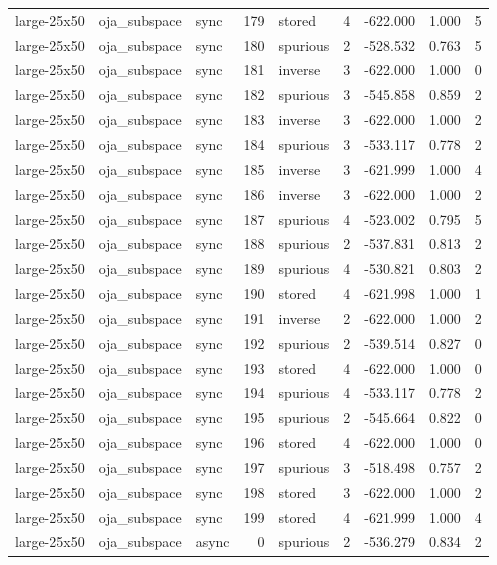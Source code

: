 \begin{tabular}{lllrlrrrr}
large-25x50 & oja\_subspace & sync & 179 & stored & 4 & -622.000 & 1.000 & 5 \\
large-25x50 & oja\_subspace & sync & 180 & spurious & 2 & -528.532 & 0.763 & 5 \\
large-25x50 & oja\_subspace & sync & 181 & inverse & 3 & -622.000 & 1.000 & 0 \\
large-25x50 & oja\_subspace & sync & 182 & spurious & 3 & -545.858 & 0.859 & 2 \\
large-25x50 & oja\_subspace & sync & 183 & inverse & 3 & -622.000 & 1.000 & 2 \\
large-25x50 & oja\_subspace & sync & 184 & spurious & 3 & -533.117 & 0.778 & 2 \\
large-25x50 & oja\_subspace & sync & 185 & inverse & 3 & -621.999 & 1.000 & 4 \\
large-25x50 & oja\_subspace & sync & 186 & inverse & 3 & -622.000 & 1.000 & 2 \\
large-25x50 & oja\_subspace & sync & 187 & spurious & 4 & -523.002 & 0.795 & 5 \\
large-25x50 & oja\_subspace & sync & 188 & spurious & 2 & -537.831 & 0.813 & 2 \\
large-25x50 & oja\_subspace & sync & 189 & spurious & 4 & -530.821 & 0.803 & 2 \\
large-25x50 & oja\_subspace & sync & 190 & stored & 4 & -621.998 & 1.000 & 1 \\
large-25x50 & oja\_subspace & sync & 191 & inverse & 2 & -622.000 & 1.000 & 2 \\
large-25x50 & oja\_subspace & sync & 192 & spurious & 2 & -539.514 & 0.827 & 0 \\
large-25x50 & oja\_subspace & sync & 193 & stored & 4 & -622.000 & 1.000 & 0 \\
large-25x50 & oja\_subspace & sync & 194 & spurious & 4 & -533.117 & 0.778 & 2 \\
large-25x50 & oja\_subspace & sync & 195 & spurious & 2 & -545.664 & 0.822 & 0 \\
large-25x50 & oja\_subspace & sync & 196 & stored & 4 & -622.000 & 1.000 & 0 \\
large-25x50 & oja\_subspace & sync & 197 & spurious & 3 & -518.498 & 0.757 & 2 \\
large-25x50 & oja\_subspace & sync & 198 & stored & 3 & -622.000 & 1.000 & 2 \\
large-25x50 & oja\_subspace & sync & 199 & stored & 4 & -621.999 & 1.000 & 4 \\
large-25x50 & oja\_subspace & async & 0 & spurious & 2 & -536.279 & 0.834 & 2 \\

\end{tabular}
